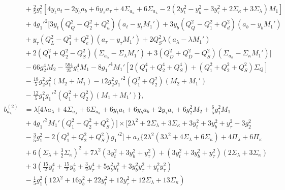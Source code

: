 \documentclass[preprint,amsmath,amssymb,aps,superscriptaddress,prd,showpacs,floatfix,nofootinbib]{revtex4-1}
\begin{document}
\begin{subequations}
\begin{align}
&{}+\frac{2}{5}g_1^2\left [ 4y_ta_t-2y_ba_b+6y_\tau a_\tau+4\Sigma_{a_\kappa}+6\Sigma_{a_\lambda}-2\left ( 2y_t^2-y_b^2+3y_\tau^2+2\Sigma_\kappa+3\Sigma_\lambda\right )M_1\right ]\nonumber\\
&{}+4g_1'^2\big [ 3y_t\left ( Q_Q^2-Q_2^2+Q_u^2\right )\left ( a_t-y_t M_1'\right )+3y_b\left ( Q_Q^2-Q_1^2+Q_d^2\right )\left ( a_b-y_bM_1'\right )\nonumber\\
&{}+y_\tau\left ( Q_L^2-Q_1^2+Q_e^2\right )\left ( a_\tau-y_\tau M_1'\right )+2Q_S^2\lambda\left ( a_\lambda-\lambda M_1'\right )\nonumber\\
&{}+2\left ( Q_1^2+Q_2^2-Q_S^2\right )\left ( \Sigma_{a_\lambda}-\Sigma_\lambda M_1'\right )+3\left ( Q_D^2+Q_{\overline{D}}^2-Q_S^2\right )\left ( \Sigma_{a_\kappa}-\Sigma_\kappa M_1'\right ) \big ]\nonumber\\
&{}-66g_2^4M_2-\frac{594}{25}g_1^4M_1-8g_1'^4M_1'\left [ 2\left ( Q_1^4+Q_2^4+Q_S^4\right )+\left ( Q_1^2+Q_2^2+Q_S^2\right )\Sigma_Q\right ]\nonumber\\
&{}-\frac{18}{5}g_2^2g_1^2\left ( M_2+M_1\right )-12g_2^2g_1'^2\left ( Q_1^2+Q_2^2\right )\left ( M_2+M_1'\right )\nonumber\\
&{}-\frac{12}{5}g_1^2g_1'^2\left ( Q_1^2+Q_2^2\right )\left ( M_1+M_1'\right )\bigg \},\label{eq:USSMTLambdaBetaTwoLoop}\\
b_{a_\lambda}^{(2)}&=\lambda \bigg [ 4\lambda a_\lambda +4\Sigma_{a_\lambda}+6\Sigma_{a_\kappa}+6y_ta_t+6y_ba_b+2y_\tau a_\tau +6g_2^2M_2+\frac{6}{5}g_1^2M_1\nonumber\\
&{}+4g_1'^2M_1'\left ( Q_1^2+Q_2^2+Q_S^2 \right )\bigg ]\times\bigg[2\lambda ^2+2 \Sigma_\lambda +3 \Sigma_\kappa +3 y_t^2+3 y_b^2+y_{\tau }^2-3 g_2^2\nonumber\\
&{}-\frac{3}{5} g_1^2 -2 \left ( Q_1^2 + Q_2^2 + Q_S^2\right )g_1'^2 \bigg]+a_\lambda\bigg \{ 2\lambda^2\left ( 3\lambda^2 +4\Sigma_\lambda +6\Sigma_\kappa \right )+4\Pi_\lambda + 6\Pi_\kappa \nonumber\\
&{}+6\left ( \Sigma_\lambda+\frac{3}{2}\Sigma_\kappa\right )^2+7\lambda^2\left ( 3y_t^2+3y_b^2+y_\tau^2\right )+\left ( 3y_t^2+3y_b^2+y_\tau^2\right )\left (2\Sigma_\lambda+3\Sigma_\kappa\right ) \nonumber\\
&{}+3\left ( \frac{15}{2}y_t^4+\frac{15}{2}y_b^4+\frac{3}{2}y_\tau^4 +5y_b^2y_t^2 +3y_b^2y_\tau^2 +y_t^2y_\tau^2\right )\nonumber\\
&{}-\frac{1}{5}g_1^2\left ( 12\lambda^2+16y_b^2+22y_t^2+12y_\tau^2+12\Sigma_\lambda +13\Sigma_\kappa \right )\nonumber\\

\end{align}
\end{subequations}
\end{document}
